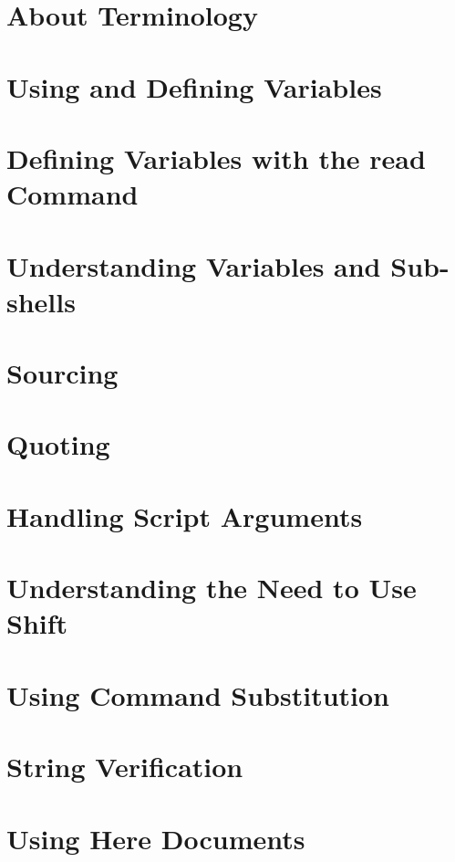 
\usepackage{minted}
\usepackage{booktabs}
\usepackage{hyperref}


	
	
	
	\section{About Terminology}
	
	
	\section{Using and Defining Variables}
	\section{Defining Variables with the read Command}
	\section{Understanding Variables and Sub-shells}
	\section{Sourcing}
	\section{Quoting}
	\section{Handling Script Arguments}
	\section{Understanding the Need to Use Shift}
	\section{Using Command Substitution}
	\section{String Verification}
	\section{Using Here Documents}
	

